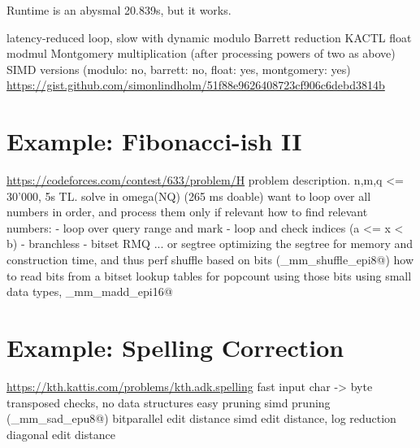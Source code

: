 \documentclass[openany]{book}
\begin{document}
Runtime is an abysmal 20.839s, but it works.

latency-reduced loop, slow with dynamic modulo
Barrett reduction
KACTL float modmul
Montgomery multiplication (after processing powers of two as above)
SIMD versions (modulo: no, barrett: no, float: yes, montgomery: yes)
\url{https://gist.github.com/simonlindholm/51f88e9626408723cf906c6debd3814b}

\chapter{Example: Fibonacci-ish II}
\url{https://codeforces.com/contest/633/problem/H}
problem description. n,m,q <= 30'000, 5s TL. solve in omega(NQ) (265 ms doable)
want to loop over all numbers in order, and process them only if relevant
how to find relevant numbers:
- loop over query range and mark
- loop and check indices (a <= x < b)
- branchless
- bitset RMQ ... or segtree
optimizing the segtree for memory and construction time, and thus perf
shuffle based on bits (\verb@_mm_shuffle_epi8@)
how to read bits from a bitset
lookup tables for popcount using those bits
using small data types, \verb@_mm_madd_epi16@

\chapter{Example: Spelling Correction}
\url{https://kth.kattis.com/problems/kth.adk.spelling}
fast input
char -> byte
transposed checks, no data structures
easy pruning
simd pruning (\verb@_mm_sad_epu8@)
bitparallel edit distance
simd edit distance, log reduction
diagonal edit distance
\end{document}
